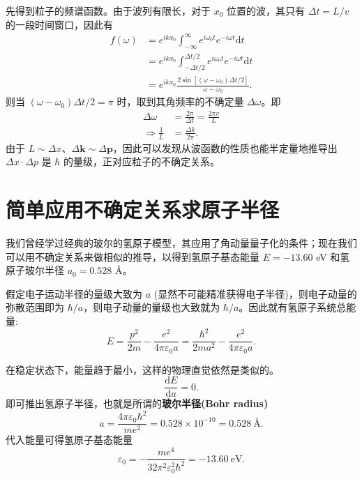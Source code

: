 \documentclass[12pt,a4paper,oneside]{book}
\begin{document}
先得到粒子的频谱函数。由于波列有限长，对于 $x_0$ 位置的波，其只有 $\Delta t=L/v$ 的一段时间窗口，因此有
\begin{equation}
    \begin{aligned}
        f(\omega)&=e^{ikx_0}\int_{-\infty}^{\infty}e^{i\omega_0t}e^{-i\omega t}\mathrm{d}t\\
        &=e^{ikx_0}\int_{-\Delta t/2}^{\Delta t/2}e^{i\omega_0t}e^{-i\omega t}\mathrm{d}t\\
        &=e^{ikx_0}\frac{2\sin[(\omega-\omega_0)\Delta t/2]}{\omega-\omega_0}.
    \end{aligned}
\end{equation}
则当 $(\omega-\omega_0)\Delta t/2 =\pi$ 时，取到其角频率的不确定量 $\Delta \omega$。即 
\begin{equation}
    \begin{aligned}
        \Delta \omega &= \frac{2\pi}{\Delta t}=\frac{2\pi v}{L}\\
        \Rightarrow\frac{1}{L} &= \frac{\Delta k}{2\pi}.
    \end{aligned}
\end{equation}
由于 $L\sim\Delta x$、$\Delta \boldsymbol{k}\sim\Delta\boldsymbol{p}$，因此可以发现从波函数的性质也能半定量地推导出 $\Delta x\cdot\Delta p$ 是 $\hbar$ 的量级，正对应粒子的不确定关系。

\section{简单应用不确定关系求原子半径}

我们曾经学过经典的玻尔的氢原子模型，其应用了角动量量子化的条件；现在我们可以用不确定关系来做相似的推导，以得到氢原子基态能量 $E=-13.60$ eV 和氢原子玻尔半径 $a_0=0.528$ \AA。

假定电子运动半径的量级大致为 $a$ (显然不可能精准获得电子半径)，则电子动量的弥散范围即为 $\hbar/a$，则电子动量的量级也大致就为 $\hbar/a$。因此就有氢原子系统总能量:
\begin{equation*}
    E=\frac{p^2}{2m}-\frac{e^2}{4\pi\varepsilon_0 a}=\frac{\hbar^2}{2ma^2}-\frac{e^2}{4\pi\varepsilon_0 a}. 
\end{equation*}

在稳定状态下，能量趋于最小，这样的物理直觉依然是类似的。$$ \frac{\mathrm{d}E}{\mathrm{d}a}=0. $$
即可推出氢原子半径，也就是所谓的\textbf{玻尔半径(Bohr radius)} 
\begin{equation*}
a=\frac{4\pi\varepsilon_0\hbar^2}{me^2}=0.528\times 10^{-10}=0.528\ \text{\AA}.
\end{equation*}
代入能量可得氢原子基态能量
\begin{equation*}
\varepsilon_0=-\frac{me^4}{32\pi^2\varepsilon_0^2\hbar^2}=-13.60\ \mathrm{eV}.
\end{equation*}
\end{document}
